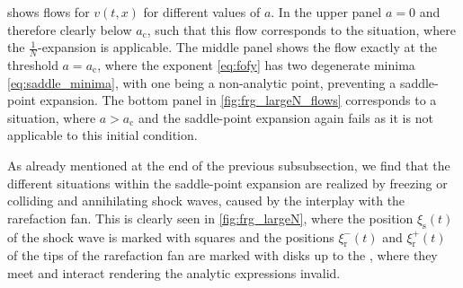  shows \frg{} flows for $v ( t, x )$ for different values of $a$.
In the upper panel $a = 0$ and therefore clearly below $a_\mathrm{c}$, such that this \frg{} flow corresponds to the situation, where the $\tfrac{1}{N}$-expansion is applicable.
The middle panel shows the \frg{} flow exactly at the threshold $a = a_\mathrm{c}$, where the exponent \eqref{eq:fofy} has two degenerate minima \eqref{eq:saddle_minima}, with one being a non-analytic point, preventing a saddle-point expansion.
The bottom panel in \cref{fig:frg_largeN_flows} corresponds to a situation, where $a > a_\mathrm{c}$ and the saddle-point expansion again fails as it is not applicable to this initial condition.

As already mentioned at the end of the previous subsubsection, we find that the different situations within the saddle-point expansion are realized by freezing or colliding and annihilating shock waves, caused by the interplay with the rarefaction fan.
This is clearly seen in \cref{fig:frg_largeN}, where the position $\xi_\mathrm{s} ( t )$ of the shock wave is marked with squares and the positions $\xi_\mathrm{r}^- ( t )$ and $\xi_\mathrm{r}^+ ( t )$ of the tips of the rarefaction fan are marked with disks \dash{} up to the \rgtime{}, where they meet and interact rendering the analytic expressions invalid.

